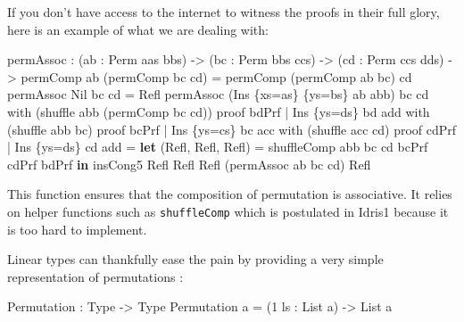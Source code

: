 \documentclass[
]{article}
\newenvironment{Shaded}{}{}
\newcommand{\DataTypeTok}[1]{\textcolor[rgb]{0.56,0.13,0.00}{#1}}
\newcommand{\DecValTok}[1]{\textcolor[rgb]{0.25,0.63,0.44}{#1}}
\newcommand{\KeywordTok}[1]{\textcolor[rgb]{0.00,0.44,0.13}{\textbf{#1}}}
\newcommand{\NormalTok}[1]{#1}
\newcommand{\OperatorTok}[1]{\textcolor[rgb]{0.40,0.40,0.40}{#1}}
\newcommand{\OtherTok}[1]{\textcolor[rgb]{0.00,0.44,0.13}{#1}}
\begin{document}
If you don't have access to the internet to witness the proofs in their
full glory, here is an example of what we are dealing with:

\begin{Shaded}
\begin{Highlighting}[]
\NormalTok{permAssoc }\OperatorTok{:}\NormalTok{ (ab }\OperatorTok{:} \DataTypeTok{Perm}\NormalTok{ aas bbs) }\OtherTok{{-}\textgreater{}}\NormalTok{ (bc }\OperatorTok{:} \DataTypeTok{Perm}\NormalTok{ bbs ccs) }
         \OtherTok{{-}\textgreater{}}\NormalTok{ (cd }\OperatorTok{:} \DataTypeTok{Perm}\NormalTok{ ccs dds)}
         \OtherTok{{-}\textgreater{}}\NormalTok{ permComp ab (permComp bc cd) }\OtherTok{=}\NormalTok{ permComp (permComp ab bc) cd}
\NormalTok{permAssoc }\DataTypeTok{Nil}\NormalTok{ bc cd }\OtherTok{=} \DataTypeTok{Refl}
\NormalTok{permAssoc (}\DataTypeTok{Ins}\NormalTok{ \{xs}\OtherTok{=}\NormalTok{as\} \{ys}\OtherTok{=}\NormalTok{bs\} ab\textquotesingle{} abb) bc cd }
\NormalTok{  with (shuffle abb (permComp bc cd)) proof bdPrf}
  \OperatorTok{|} \DataTypeTok{Ins}\NormalTok{ \{ys}\OtherTok{=}\NormalTok{ds\} bd\textquotesingle{} add with (shuffle abb bc) proof bcPrf}
    \OperatorTok{|} \DataTypeTok{Ins}\NormalTok{ \{ys}\OtherTok{=}\NormalTok{cs\} bc\textquotesingle{} acc with (shuffle acc cd) proof cdPrf}
      \OperatorTok{|} \DataTypeTok{Ins}\NormalTok{ \{ys}\OtherTok{=}\NormalTok{ds\textquotesingle{}\} cd\textquotesingle{} ad\textquotesingle{}d }\OtherTok{=}
        \KeywordTok{let}\NormalTok{ (}\DataTypeTok{Refl}\NormalTok{, }\DataTypeTok{Refl}\NormalTok{, }\DataTypeTok{Refl}\NormalTok{) }\OtherTok{=}\NormalTok{ shuffleComp abb bc cd bcPrf cdPrf bdPrf}
         \KeywordTok{in}\NormalTok{ insCong5 }\DataTypeTok{Refl} \DataTypeTok{Refl} \DataTypeTok{Refl}\NormalTok{ (permAssoc ab\textquotesingle{} bc\textquotesingle{} cd\textquotesingle{}) }\DataTypeTok{Refl}
\end{Highlighting}
\end{Shaded}

This function ensures that the composition of permutation is
associative. It relies on helper functions such as \texttt{shuffleComp}
which is postulated in Idris1 because it is too hard to implement.

Linear types can thankfully ease the pain by providing a very simple
representation of permutations :

\begin{Shaded}
\begin{Highlighting}[]
\DataTypeTok{Permutation} \OperatorTok{:} \DataTypeTok{Type} \OtherTok{{-}\textgreater{}} \DataTypeTok{Type}
\DataTypeTok{Permutation}\NormalTok{ a }\OtherTok{=}\NormalTok{ (}\DecValTok{1}\NormalTok{ ls }\OperatorTok{:} \DataTypeTok{List}\NormalTok{ a) }\OtherTok{{-}\textgreater{}} \DataTypeTok{List}\NormalTok{ a}
\end{Highlighting}
\end{Shaded}
\end{document}
